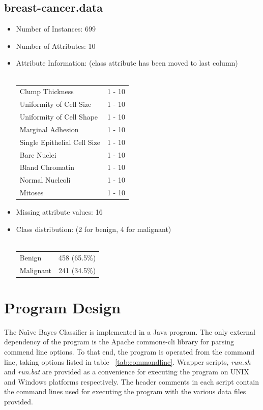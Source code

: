 \documentclass[10pt]{report}
\begin{document}
\subsection*{breast-cancer.data}
\begin{itemize}
\item Number of Instances: 699
\item Number of Attributes: 10
\item Attribute Information: (class attribute has been moved to last column)
  \\\\
  \begin{left}
    \begin{tabular}{ l l }
      Clump Thickness               &  1 - 10  \\
      Uniformity of Cell Size       &  1 - 10  \\
      Uniformity of Cell Shape      &  1 - 10  \\
      Marginal Adhesion             &  1 - 10  \\
      Single Epithelial Cell Size   &  1 - 10  \\
      Bare Nuclei                   &  1 - 10  \\
      Bland Chromatin               &  1 - 10  \\
      Normal Nucleoli               &  1 - 10  \\
      Mitoses                       &  1 - 10  \\
    \end{tabular}
  \end{left}

\item Missing attribute values: 16
\item Class distribution: (2 for benign, 4 for malignant)
  \\\\
  \begin{left}
    \begin{tabular}{ l l }
      Benign       &  458 (65.5\%) \\
      Malignant    &  241 (34.5\%) \\
    \end{tabular}
  \end{left}
\end{itemize}


\section{Program Design}
The Na\"{\i}ve Bayes Classifier is implemented in a Java program. The only
external dependency of the program is the Apache commons-cli library for parsing
commend line options. To that end, the program is operated from the
command line, taking options listed in table
~\ref{tab:commandline}. Wrapper scripts, \textit{run.sh} and
\textit{run.bat} are provided as a convenience for executing the
program on UNIX and Windows platforms respectively. The header
comments in each script contain the command lines used for executing
the program with the various data files provided.
\end{document}

